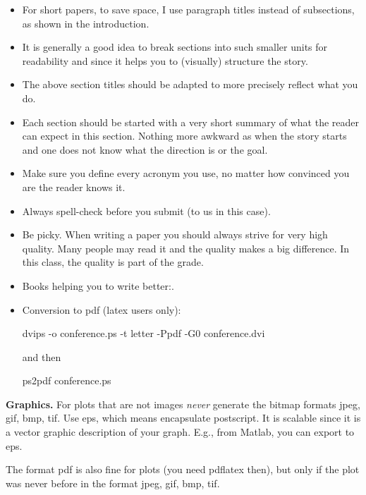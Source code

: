 \documentclass[conference]{IEEEtran}
\newcommand{\mypar}[1]{{\bf #1.}}
\begin{document}
\begin{itemize}
  \item For short papers, to save space, I use paragraph titles instead of subsections,
        as shown in the introduction.

  \item It is generally a good idea to break sections into such smaller units for
        readability and since it helps you to (visually) structure the story.

  \item The above section titles should be adapted to more precisely reflect what you
        do.

  \item Each section should be started with a very short summary of what the reader can
        expect in this section. Nothing more awkward as when the story starts and one
        does not know what the direction is or the goal.

  \item Make sure you define every acronym you use, no matter how convinced you are the
        reader knows it.

  \item Always spell-check before you submit (to us in this case).

  \item Be picky. When writing a paper you should always strive for very high quality.
        Many people may read it and the quality makes a big difference. In this class,
        the quality is part of the grade.

  \item Books helping you to write better:.

  \item Conversion to pdf (latex users only):

        dvips -o conference.ps -t letter -Ppdf -G0 conference.dvi

        and then

        ps2pdf conference.ps
\end{itemize}

\mypar{Graphics} For plots that are not images {\em never} generate the bitmap formats
jpeg, gif, bmp, tif. Use eps, which means encapsulate postscript. It is
scalable since it is a vector graphic description of your graph. E.g.,
from Matlab, you can export to eps.

The format pdf is also fine for plots (you need pdflatex then), but only if the
plot was never before in the format jpeg, gif, bmp, tif.
\end{document}
